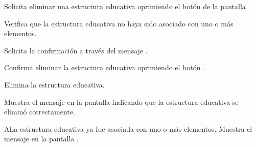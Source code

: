 \begin{UCtrayectoria}
	\UCpaso [\UCactor] Solicita eliminar una estructura educativa oprimiendo el botón  de la pantalla .
	
	\UCpaso [\UCsist] Verifica que la estructura educativa no haya sido asociado con uno o más elementos. 
	
	\UCpaso [\UCsist] Solicita la confirmación a través del mensaje .
	
	\UCpaso [\UCactor] Confirma eliminar la estructura educativa oprimiendo el botón .
	
	\UCpaso [\UCsist] Elimina la estructura educativa.
	
	\UCpaso [\UCsist] Muestra el mensaje  en la pantalla  indicando que la estructura educativa se eliminó correctamente.	
	
\end{UCtrayectoria}

\begin{UCtrayectoriaA}{A}{La estructura educativa ya fue asociada con uno o más elementos.}
	\UCpaso [\UCsist] Muestra el mensaje  en la pantalla . 
\end{UCtrayectoriaA}
